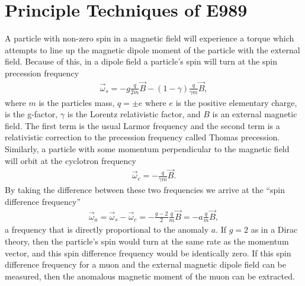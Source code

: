 
\thispagestyle{myheadings}

\graphicspath{{Body/Figures/ExperimentalOverview/Decay/}{Body/Figures/TrackingFigures/TrackerPics/}{Body/Figures/ExperimentalOverview/Ring/}{Body/Figures/ExperimentalOverview/Accelerator/}{Body/Figures/ExperimentalOverview/Beam/}{Body/Figures/ExperimentalOverview/Auxiliary/}{Body/Figures/MagneticField/}}

\chapter{Principle Techniques of E989}
\label{chapter:E989}

A particle with non-zero spin in a magnetic field will experience a torque which attempts to line up the magnetic dipole moment of the particle with the external field. Because of this, in a dipole field a particle's spin will turn at the spin precession frequency \cite{Jackson}
        \begin{align} \label{eq:ws}
            \vec{\omega}_{s} = -g\frac{q}{2m}\vec{B} - (1-\gamma)\frac{q}{\gamma m}\vec{B},
        \end{align}
where $m$ is the particles mass, $q = \pm e$ where $e$ is the positive elementary charge, \g is the g-factor, $\gamma$ is the Lorentz relativistic factor, and $B$ is an external magnetic field. The first term is the usual Larmor frequency and the second term is a relativistic correction to the precession frequency called Thomas precession. Similarly, a particle with some momentum perpendicular to the magnetic field will orbit at the cyclotron frequency
        \begin{align} \label{eq:wc}
            \vec{\omega}_{c} = -\frac{q}{\gamma m}\vec{B}.
        \end{align}
By taking the difference between these two frequencies we arrive at the ``spin difference frequency''
        \begin{align} \label{eq:wasimple}
            \vec{\omega}_{a} = \vec{\omega}_{s} - \vec{\omega}_{c} = -\frac{g-2}{2}\frac{q}{m}\vec{B} = - a \frac{q}{m}\vec{B},
        \end{align}
a frequency that is directly proportional to the anomaly $a$. If $g = 2$ as in a Dirac theory, then the particle's spin would turn at the same rate as the momentum vector, and this spin difference frequency \wa would be identically zero. If this spin difference frequency for a muon and the external magnetic dipole field can be measured, then the anomalous magnetic moment of the muon \amu can be extracted.


